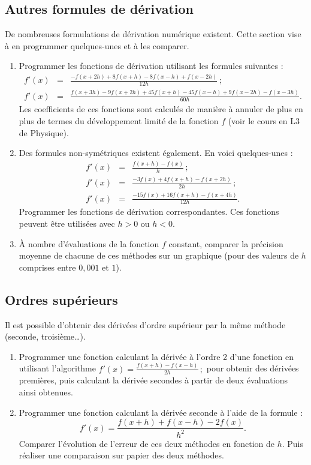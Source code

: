 \subsection{Autres formules de dérivation}

De  nombreuses  formulations  de  dérivation  numérique  existent.  Cette
section vise à en programmer quelques-unes et à les comparer.
\begin{enumerate}
\item Programmer les fonctions de dérivation utilisant les formules suivantes :
  \begin{eqnarray*}
f'(x) &=& \frac{-f(x+2h)+8f(x+h)-8f(x-h)+f(x-2h)}{12h}\,; \\
f'(x) &=& \frac{f(x+3h)-9f(x+2h)+45f(x+h)-45f(x-h)+9f(x-2h)-f(x-3h)}{60h}.
  \end{eqnarray*}
Les coefficients de ces fonctions sont calculés de manière à annuler de plus en
plus de termes du développement limité de la fonction $f$ (voir le cours en L3 de Physique).
\item Des formules non-symétriques existent également. En voici quelques-unes :
   \begin{eqnarray*}
f'(x) &=& \frac{f(x+h)-f(x)}{h}\,;\\
f'(x) &=& \frac{-3f(x)+4f(x+h) -f(x+2h)}{2h}\,;\\
f'(x) &=& \frac{-15f(x)+16f(x+h) -f(x+4h)}{12h}.
  \end{eqnarray*}
 Programmer les fonctions de dérivation correspondantes. Ces fonctions peuvent être utilisées avec $h>0$ ou $h<0$.
\item  À nombre  d'évaluations de  la fonction  $f$ constant,  comparer la
  précision moyenne de chacune de  ces méthodes sur un graphique (pour
  des valeurs de $h$ comprises entre $0,001$ et $1$).
\end{enumerate}



\subsection{Ordres supérieurs \sc{[Facultatif]}}
Il est possible  d'obtenir des dérivées d'ordre supérieur  par la même
méthode (seconde, troisième\ldots).
\begin{enumerate}
\item Programmer une  fonction calculant la dérivée à  l'ordre 2 d'une
  fonction        en       utilisant        l'algorithme       $f'(x)=
  \frac{f(x+h)-f(x-h)}{2h}\,;$  pour  obtenir des  dérivées  premières,
  puis  calculant la  dérivée secondes  à partir  de deux  évaluations ainsi
  obtenues.
\item Programmer une fonction calculant la dérivée seconde à l'aide de
  la formule :
$$f'(x)=  \frac{f(x+h)+f(x-h)-2f(x)}{h^2}.$$  Comparer l'évolution  de
  l'erreur de ces deux méthodes en  fonction de $h$. Puis réaliser une
  comparaison \og{} sur papier \fg{} des deux méthodes.
\end{enumerate}

